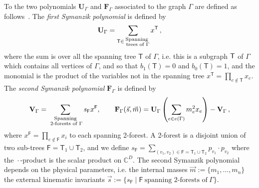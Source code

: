 \documentclass[a4paper,12pt]{article}
\numberwithin{equation}{section}
\numberwithin{figure}{section}
\begin{document}
To the two polynomials $\textbf{U}_\Gamma$ and $\textbf{F}_\Gamma$
associated to the graph $\Gamma$ are defined as
follows~\cite{nakanishi1971graph,Weinzierl:2022eaz}.  The {\em first
  Symanzik polynomial} is defined by
\begin{equation}\label{e:Udef}
{\bf U}_\Gamma = \sum_{\mathsf{T} \in \substack{ \text{Spanning} \\ \text{ trees of } \Gamma}} x^{\mathsf{T}}\,, 
\end{equation}
where the sum is over all the spanning tree $\mathsf{T}$ of $\Gamma$,
i.e.  this is a subgraph ${\sf T}$ of $\Gamma$ which contains all
vertices of $\Gamma$, and so that $b_1(\mathsf{T}) =0$ and
$b_0(\mathsf{T})=1$, and the
monomial is the product of the variables not in the spanning tree
$x^{\mathsf{T}} = \prod_{e\notin {\mathsf{T}}} x_e$. 
The {\em second 
  Symanzik polynomial}  $\textbf{F}_\Gamma$ is defined by
\begin{equation}\label{e:VFdef}
{\bf V}_{\Gamma} = \sum_{\substack{ \text{Spanning} \\ \text{ 2-forests
      of } \Gamma}}s_{\mathsf{F}} x^{\mathsf{F}}  ,\qquad {\bf F}_{\Gamma}(\vec{s}, \vec{m}) = {\bf U}_\Gamma\left( \sum_{e \in e(\Gamma)} m_e^2 x_e\right) - {\bf V}_{\Gamma}\,,
\end{equation}
where $x^{\mathsf{F}} =
\prod_{e \notin \mathsf{F}} x_i$ to each spanning 2-forest. A 2-forest
is a disjoint union of two sub-trees $\mathsf{F}=\mathsf{T}_1\cup \mathsf{T}_2$,  and we define $s_\mathsf{F} = \sum_{(v_1,v_2) \in \mathsf{F}=\mathsf{T}_1\cup \mathsf{T}_2} p_{v_1}\cdot p_{v_2}$ where the ${}\cdot{}$-product is the
scalar product on $\mathbb {C}^{D}$.
The second Symanzik polynomial depends on the physical parameters,
i.e. the
internal masses $\vec m:=\{m_1,\dots,m_n\}$ the external kinematic invariants
$\vec s:=\{s_\textsf{F} \mid \textsf{F} ~ \textrm{spanning
2-forests of}~\Gamma\}$.
\end{document}
